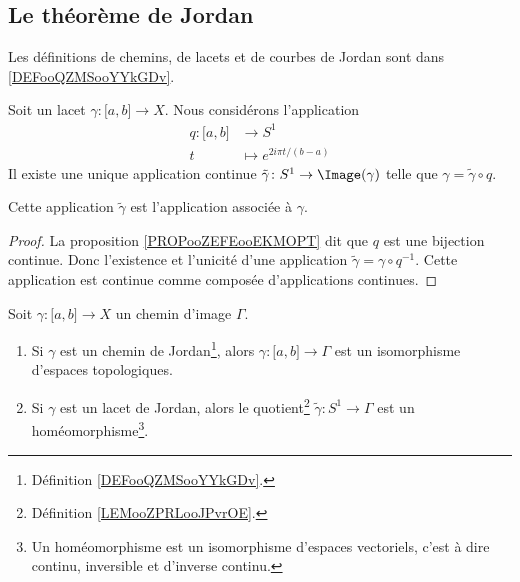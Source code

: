 


\subsection{Le théorème de Jordan}

Les définitions de chemins, de lacets et de courbes de Jordan sont dans \ref{DEFooQZMSooYYkGDv}.

\begin{lemmaDef}     \label{LEMooZPRLooJPvrOE}
    Soit un lacet \( \gamma\colon \mathopen[ a , b \mathclose]\to X\). Nous considérons l'application
    \begin{equation}
        \begin{aligned}
            q\colon \mathopen[ a , b \mathclose]&\to S^1 \\
            t&\mapsto  e^{2i\pi t/(b-a)} 
        \end{aligned}
    \end{equation}
    Il existe une unique application continue \( \tilde \gamma\colon S^1\to \Image(\gamma)\) telle que \( \gamma=\tilde \gamma\circ q\).

    Cette application \( \tilde \gamma\) est l'application  associée à \( \gamma\).
\end{lemmaDef}

\begin{proof}
    La proposition \ref{PROPooZEFEooEKMOPT} dit que \( q\) est une bijection continue. Donc l'existence et l'unicité d'une application \( \tilde \gamma=\gamma\circ q^{-1}\). Cette application est continue comme composée d'applications continues.
\end{proof}

\begin{lemma}     \label{LEMooCGVOooVPlSRD}
    Soit \( \gamma\colon \mathopen[ a , b \mathclose]\to X\) un chemin d'image \( \Gamma\).
    \begin{enumerate}
        \item       \label{ITEMooWKVAooCQDvpL}
            Si \( \gamma\) est un chemin de Jordan\footnote{Définition \ref{DEFooQZMSooYYkGDv}.}, alors \( \gamma\colon \mathopen[ a , b \mathclose]\to \Gamma\) est un isomorphisme d'espaces topologiques.
        \item       \label{ITEMooVYMXooEtgPJT}
            Si \( \gamma\) est un lacet de Jordan, alors le quotient\footnote{Définition \ref{LEMooZPRLooJPvrOE}.} \( \tilde \gamma\colon S^1\to \Gamma\) est un homéomorphisme\footnote{Un homéomorphisme est un isomorphisme d'espaces vectoriels, c'est à dire continu, inversible et d'inverse continu.}.
    \end{enumerate}
\end{lemma}

